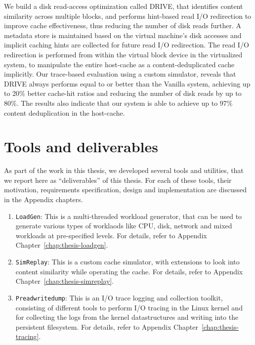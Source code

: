 We build a disk read-access optimization called DRIVE, that
identifies content similarity across multiple blocks, and performs
hint-based read I/O redirection to improve cache effectiveness,
thus reducing the number of disk reads further.
A metadata store is maintained based on the virtual machine's disk
accesses and implicit caching hints are collected
for future read I/O redirection.
The read I/O redirection is performed from within the virtual
block device in the virtualized system, to manipulate the entire
host-cache as a content-deduplicated cache implicitly.
Our trace-based evaluation using a custom simulator, 
reveals that
DRIVE always performs equal to or better than the Vanilla system,
achieving up to 20\% better cache-hit ratios and reducing the
number of disk reads by up to 80\%. The results also indicate that
our system is able to achieve up to 97\% content 
deduplication in the host-cache.

\section{Tools and deliverables}
As part of the work in this thesis, we developed several tools and utilities,
that we report here as ``deliverables'' of this thesis. For each of these
tools, their motivation, requirements specification, design and 
implementation are discussed in the Appendix chapters.
\begin{enumerate}
	\item \texttt{LoadGen}: This is a multi-threaded workload generator, 
		that can be used to generate various types of worklaods like
		CPU, disk, network and mixed workloads at pre-specified levels.
		For details, refer to Appendix Chapter~\ref{chap:thesis-loadgen}.
	\item \texttt{SimReplay}: This is a custom cache simulator, with 
		extensions to look into content similarity while operating 
		the cache. For details, refer to Appendix 
		Chapter~\ref{chap:thesis-simreplay}.
	\item \texttt{Preadwritedump}: This is an I/O trace logging and
		collection toolkit, consisting of different tools to perform
		I/O tracing in the Linux kernel and for collecting the logs
		from the kernel datastructures and writing 
		into the persistent filesystem. For details, refer to Appendix 
        Chapter~\ref{chap:thesis-tracing}.
\end{enumerate}

